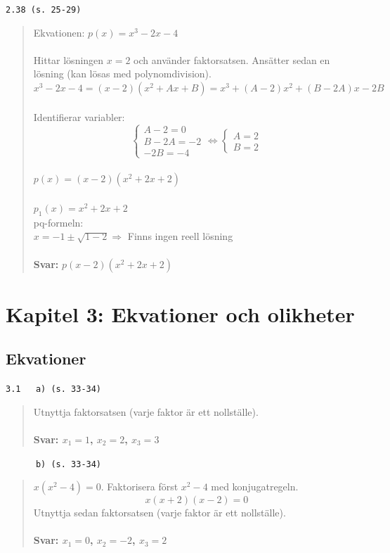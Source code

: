 \documentclass[a4paper]{article}
\newcommand{\tskcol}[1]{\textcolor{tskcol}{#1}}
\begin{document}
	\texttt{\tskcol{2.38 (s. 25-29)}}
	\begin{quotation}
		\noindent
		Ekvationen: $p(x)=x^3-2x-4$ \\ \\
		Hittar lösningen $x=2$ och använder faktorsatsen. Ansätter sedan en lösning (kan lösas med polynomdivision). \\
		$x^3-2x-4=(x-2)(x^2+Ax+B)=x^3+(A-2)x^2+(B-2A)x-2B$ \\ \\
		Identifierar variabler: \\
		\[\begin{cases} 
			A-2=0 \\ 
			B-2A=-2 \\ 
			-2B=-4 
		\end{cases}
		\Leftrightarrow
		\begin{cases} 
			A=2 \\ 
			B=2
		\end{cases}\]
		\\
		$p(x)=(x-2)(x^2+2x+2)$ \\ \\
		$p_1(x)=x^2+2x+2$ \\
		pq-formeln: \\
		$x=-1\pm\sqrt{1-2} \Rightarrow$ Finns ingen reell lösning
		\\ \\
		\textbf{Svar:} $p(x-2)(x^2+2x+2)$
	\end{quotation}
	
	\pagebreak
	\section*{Kapitel 3: Ekvationer och olikheter}
	\subsection*{Ekvationer}
	
	\texttt{\tskcol{3.1~~~a) (s. 33-34)}}
	\begin{quotation}
		\noindent
		Utnyttja faktorsatsen (varje faktor är ett nollställe).
		\\ \\
		\textbf{Svar: $x_1=1$, $x_2=2$, $x_3=3$}
	\end{quotation}
	
	\texttt{\tskcol{~~~~~~b) (s. 33-34)}}
	\begin{quotation}
		\noindent
		$x(x^2-4)=0$. Faktorisera först $x^2-4$ med konjugatregeln.
		\[x(x+2)(x-2)=0\]
		Utnyttja sedan faktorsatsen (varje faktor är ett nollställe).
		\\ \\
		\textbf{Svar: $x_1=0$, $x_2=-2$, $x_3=2$}
	\end{quotation}
	
\end{document}
